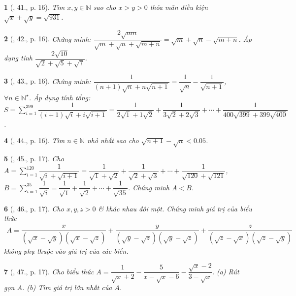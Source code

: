 \documentclass{article}
\newtheorem{baitoan}{}
\begin{document}
\begin{baitoan}[\cite{Tuyen_Toan_9_old}, 41., p. 16]
	Tìm $x,y\in\mathbb{N}$ sao cho $x > y > 0$ thỏa mãn điều kiện $\sqrt{x} + \sqrt{y} = \sqrt{931}$.
\end{baitoan}

\begin{baitoan}[\cite{Tuyen_Toan_9_old}, 42., p. 16]
	Chứng minh: $\dfrac{2\sqrt{mn}}{\sqrt{m} + \sqrt{n} + \sqrt{m + n}} = \sqrt{m} + \sqrt{n} - \sqrt{m + n}$. Áp dụng tính $\dfrac{2\sqrt{10}}{\sqrt{2} + \sqrt{5} + \sqrt{7}}$.
\end{baitoan}

\begin{baitoan}[\cite{Tuyen_Toan_9_old}, 43., p. 16]
	Chứng minh: $\dfrac{1}{(n + 1)\sqrt{n} + n\sqrt{n + 1}} = \dfrac{1}{\sqrt{n}} - \dfrac{1}{\sqrt{n + 1}}$, $\forall n\in\mathbb{N}^\star$. Áp dụng tính tổng: $S = \sum_{i=1}^{399} \dfrac{1}{(i + 1)\sqrt{i} + i\sqrt{i + 1}} = \dfrac{1}{2\sqrt{1} + 1\sqrt{2}} + \dfrac{1}{3\sqrt{2} + 2\sqrt{3}} + \cdots + \dfrac{1}{400\sqrt{399} + 399\sqrt{400}}$.
\end{baitoan}

\begin{baitoan}[\cite{Tuyen_Toan_9_old}, 44., p. 16]
	Tìm $n\in\mathbb{N}$ nhỏ nhất sao cho $\sqrt{n + 1} - \sqrt{n} < 0.05$.
\end{baitoan}

\begin{baitoan}[\cite{Tuyen_Toan_9_old}, 45., p. 17]
	Cho $A = \sum_{i=1}^{120} \dfrac{1}{\sqrt{i} + \sqrt{i + 1}} = \dfrac{1}{\sqrt{1} + \sqrt{2}} + \dfrac{1}{\sqrt{2} + \sqrt{3}} + \cdots + \dfrac{1}{\sqrt{120} + \sqrt{121}}$, $B = \sum_{i=1}^{35} \dfrac{1}{\sqrt{i}} = \dfrac{1}{\sqrt{1}} + \dfrac{1}{\sqrt{2}} + \cdots + \dfrac{1}{\sqrt{35}}$. Chứng minh $A < B$.
\end{baitoan}

\begin{baitoan}[\cite{Tuyen_Toan_9_old}, 46., p. 17]
	Cho $x,y,z > 0$ \& khác nhau đôi một. Chứng minh giá trị của biểu thức
	\begin{align*}
		A = \dfrac{x}{(\sqrt{x} - \sqrt{y})(\sqrt{x} - \sqrt{z})} + \dfrac{y}{(\sqrt{y} - \sqrt{z})(\sqrt{y} - \sqrt{z})} + \dfrac{z}{(\sqrt{z} - \sqrt{x})(\sqrt{z} - \sqrt{y})}
	\end{align*}
	không phụ thuộc vào giá trị của các biến.
\end{baitoan}

\begin{baitoan}[\cite{Tuyen_Toan_9_old}, 47., p. 17]
	Cho biểu thức $A = \dfrac{1}{\sqrt{x} + 2} - \dfrac{5}{x - \sqrt{x} - 6} - \dfrac{\sqrt{x} - 2}{3 - \sqrt{x}}$. (a) Rút gọn $A$. (b) Tìm giá trị lớn nhất của $A$.
\end{baitoan}
\end{document}
